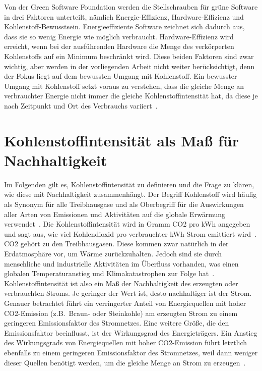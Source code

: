 Von der Green Software Foundation werden die Stellschrauben für grüne Software in drei Faktoren unterteilt, nämlich Energie-Effizienz, Hardware-Effizienz und Kohlenstoff-Bewusstsein.
Energieeffiziente Software zeichnet sich dadurch aus, dass sie so wenig Energie wie möglich verbraucht.
Hardware-Effizienz wird erreicht, wenn bei der ausführenden Hardware die Menge des verkörperten Kohlenstoffs auf ein Minimum beschränkt wird.
Diese beiden Faktoren sind zwar wichtig, aber werden in der vorliegenden Arbeit nicht weiter berücksichtigt, denn der Fokus liegt auf dem bewussten Umgang mit Kohlenstoff.
Ein bewusster Umgang mit Kohlenstoff setzt voraus zu verstehen, dass die gleiche Menge an verbrauchter Energie nicht immer die gleiche Kohlenstoffintensität hat, da diese je nach Zeitpunkt und Ort des Verbrauchs variiert~\cite{GreenSoftwareFoundation.2022}.

\section{Kohlenstoffintensität als Maß für Nachhaltigkeit}
Im Folgenden gilt es, Kohlenstoffintensität zu definieren und die Frage zu klären, wie diese mit Nachhaltigkeit zusammenhängt.
Der Begriff Kohlenstoff wird häufig als Synonym für alle Treibhausgase und als Oberbegriff für die Auswirkungen aller Arten von Emissionen und Aktivitäten auf die globale Erwärmung verwendet~\cite{GreenSoftwareFoundation.2022}.
Die Kohlenstoffintensität wird in Gramm \ac{CO2} pro \ac{kWh} angegeben und sagt aus, wie viel Kohlendioxid pro verbrauchter \ac{kWh} Strom emittiert wird~\cite{LyndonRuff.20220420T15:34:17.000Z}.
\ac{CO2} gehört zu den Treibhausgasen.
Diese kommen zwar natürlich in der Erdatmosphäre vor, um Wärme zurückzuhalten.
Jedoch sind sie durch menschliche und industrielle Aktivitäten im Überfluss vorhanden, was einen globalen Temperaturanstieg und Klimakatastrophen zur Folge hat~\cite{Currie.2024}.
Kohlenstoffintensität ist also ein Maß der Nachhaltigkeit des erzeugten oder verbrauchten Stroms.
Je geringer der Wert ist, desto nachhaltiger ist der Strom.
Genauer betrachtet führt ein verringerter Anteil von Energiequellen mit hoher \ac{CO2}-Emission (z.B.\ Braun- oder Steinkohle) am erzeugten Strom zu einem geringeren Emissionsfaktor des Stromnetzes.
Eine weitere Größe, die den Emissionsfaktor beeinflusst, ist der Wirkungsgrad des Energieträgers.
Ein Anstieg des Wirkungsgrads von Energiequellen mit hoher \ac{CO2}-Emission führt letztlich ebenfalls zu einem geringeren Emissionsfaktor des Stromnetzes, weil dann weniger dieser Quellen benötigt werden, um die gleiche Menge an Strom zu erzeugen~\cite{Icha.2020}.

